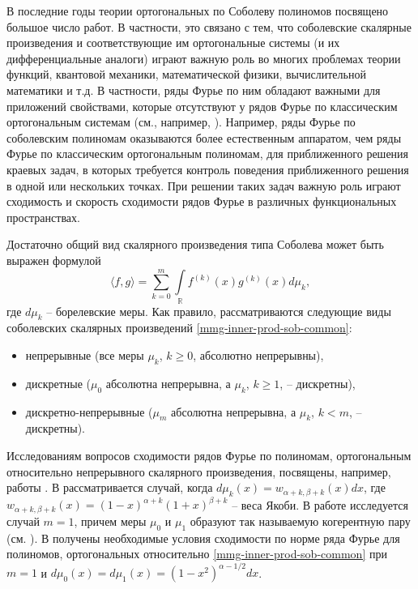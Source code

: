 ﻿\Introduction

В последние годы теории ортогональных по Соболеву полиномов посвящено большое число работ. В частности, это связано с тем, что соболевские скалярные произведения и соответствующие им ортогональные системы (и их дифференциальные аналоги) играют важную роль во многих проблемах теории функций, квантовой механики, математической физики, вычислительной математики и т.д. В частности, ряды Фурье по ним обладают важными для приложений свойствами, которые отсутствуют у рядов Фурье по классическим ортогональным системам (см., например, \cite{Ram-Ba-Ra-Pe, Ram-Mar-Xu, mmg-SharapudinovUMN}).
Например, ряды Фурье по соболевским полиномам оказываются более естественным аппаратом, чем ряды Фурье по классическим ортогональным полиномам, для приближенного решения краевых задач, в которых требуется контроль поведения приближенного решения в одной или нескольких точках.
При решении таких задач важную роль играют сходимость и скорость сходимости рядов Фурье в различных функциональных пространствах.

Достаточно общий вид скалярного произведения типа Соболева может быть выражен формулой
\begin{equation}\label{mmg-inner-prod-sob-common}
	\langle f,g \rangle = \sum_{k=0}^{m}\int\limits_{\mathbb{R}}f^{(k)}(x)g^{(k)}(x)d\mu_k,
\end{equation}
где $d\mu_k$ -- борелевские меры.
Как правило, рассматриваются следующие виды соболевских скалярных произведений \eqref{mmg-inner-prod-sob-common}:
\begin{itemize}
	\item
	непрерывные (все меры $\mu_k$, $k \ge 0$, абсолютно непрерывны),
	\item
	дискретные ($\mu_0$ абсолютна непрерывна, а $\mu_k$, $k \ge 1$, -- дискретны),
	\item
	дискретно-непрерывные ($\mu_m$ абсолютна непрерывна, а $\mu_k$, $k < m$, -- дискретны).	
\end{itemize}

Исследованиям вопросов сходимости рядов Фурье по полиномам, ортогональным относительно непрерывного скалярного произведения, посвящены, например, работы \cite{mmg-MarcellanJacobiSobolev, mmg-CiaurriJacobiSobolev, mmg-CiaurriCoherentPairs, mmg-Fejzullahu2010, mmg-Fejzullahu2013}. В \cite{mmg-MarcellanJacobiSobolev, mmg-CiaurriJacobiSobolev} рассматривается случай, когда $d\mu_k(x)=w_{\alpha+k,\beta+k}(x)dx$, где $w_{\alpha+k,\beta+k}(x)=(1-x)^{\alpha+k}(1+x)^{\beta+k}$ -- веса Якоби. В работе \cite{mmg-CiaurriCoherentPairs} исследуется случай $m=1$, причем меры $\mu_0$ и $\mu_1$ образуют так называемую когерентную пару (см. \cite{mmg-IserlesKoch1991, mmg-MarcellanXu2015}). В \cite{mmg-Fejzullahu2010} получены необходимые условия сходимости по норме ряда Фурье для полиномов, ортогональных относительно \eqref{mmg-inner-prod-sob-common} при $m=1$ и $d\mu_0(x)=d\mu_1(x)=(1-x^2)^{\alpha-1/2}dx$.

